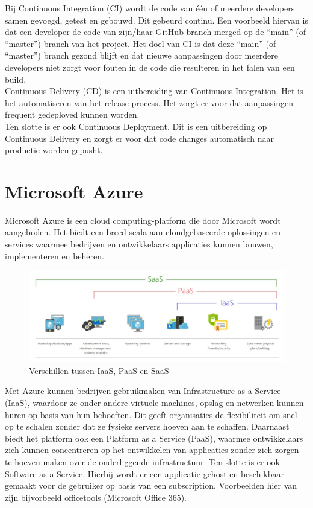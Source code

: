 Bij Continuous Integration (CI) wordt de code van één of meerdere developers samen gevoegd, getest en gebouwd. Dit gebeurd continu. Een voorbeeld hiervan is dat een developer de code van zijn/haar GitHub branch merged op de ``main'' (of ``master'') branch van het project. Het doel van CI is dat deze ``main'' (of ``master'') branch gezond blijft en dat nieuwe aanpassingen door meerdere developers niet zorgt voor fouten in de code die resulteren in het falen van een build.~\autocite{Jackson2020}\\

Continuous Delivery (CD) is een uitbereiding van Continuous Integration. Het is het automatiseren van het release process. Het zorgt er voor dat aanpassingen frequent gedeployed kunnen worden.~\autocite{Jackson2020}\\

Ten slotte is er ook Continuous Deployment. Dit is een uitbereiding op Continuous Delivery en zorgt er voor dat code changes automatisch naar productie worden gepusht.~\autocite{Jackson2020}\\

\section{Microsoft Azure}

Microsoft Azure is een cloud computing-platform die door Microsoft wordt aangeboden. Het biedt een breed scala aan cloudgebaseerde oplossingen en services waarmee bedrijven en ontwikkelaars applicaties kunnen bouwen, implementeren en beheren. \\

\begin{figure}[H]
    \centering
    \includegraphics[width=1\textwidth]{./graphics/standvanzaken/verschillen.jpg}
    \caption{Verschillen tussen IaaS, PaaS en SaaS~\autocite{Stoenescu2021}}
\end{figure}

Met Azure kunnen bedrijven gebruikmaken van Infrastructure as a Service (IaaS), waardoor ze onder andere virtuele machines, opslag en netwerken kunnen huren op basis van hun behoeften. Dit geeft organisaties de flexibiliteit om snel op te schalen zonder dat ze fysieke servers hoeven aan te schaffen. Daarnaast biedt het platform ook een Platform as a Service (PaaS), waarmee ontwikkelaars zich kunnen concentreren op het ontwikkelen van applicaties zonder zich zorgen te hoeven maken over de onderliggende infrastructuur. Ten slotte is er ook Software as a Service. Hierbij wordt er een applicatie gehost en beschikbaar gemaakt voor de gebruiker op basis van een subscription. Voorbeelden hier van zijn bijvorbeeld officetools (Microsoft Office 365).~\autocite{Suneetha2024} \\

